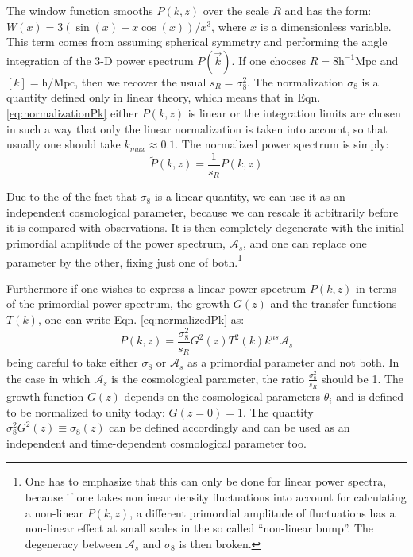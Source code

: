 The window function smooths $P(k,z)$ over the scale $R$ and has
the form: $W(x)=3(\sin(x)-x\cos(x))/x^{3}$, where $x$ is a dimensionless
variable. This term comes from assuming spherical symmetry and performing
the angle integration of the 3-D power spectrum $P(\vec{k})$. If
one chooses $R=8\mbox{h}^{-1}\mbox{Mpc}$ and $[k]=\mbox{h}/\mbox{Mpc}$,
then we recover the usual $s_{R}=\sigma_{8}^{2}$. The normalization
$\sigma_{8}$ is a quantity defined only in linear theory, which means
that in Eqn. \ref{eq:normalizationPk} either $P(k,z)$ is linear
or the integration limits are chosen in such a way that only the linear
normalization is taken into account, so that usually one should take
$k_{max}\approx0.1$. The normalized power spectrum is simply: 
\begin{equation}
\tilde{P}(k,z)=\frac{1}{s_{R}}P(k,z)
\end{equation}


Due to the of the fact that $\sigma_{8}$ is a linear quantity, we
can use it as an independent cosmological parameter, because we can
rescale it arbitrarily before it is compared with observations. It
is then completely degenerate with the initial primordial amplitude
of the power spectrum, $\mathcal{A}_{s}$, and one can replace one
parameter by the other, fixing just one of both.\footnote{One has to emphasize that this can only be done for linear power spectra,
	because if one takes nonlinear density fluctuations into account for
	calculating a non-linear $P(k,z)$, a different primordial amplitude
	of fluctuations has a non-linear effect at small scales in the so
	called ``non-linear bump''. The degeneracy between $\mathcal{A}_{s}$
	and $\sigma_{8}$ is then broken.}

Furthermore if one wishes to express a linear power spectrum $P(k,z)$
in terms of the primordial power spectrum, the growth $G(z)$ and
the transfer functions $T(k)$, one can write Eqn. \ref{eq:normalizedPk}
as: 
\begin{equation}
P(k,z)=\frac{\sigma_{8}^{2}}{s_{R}}G^{2}(z)T^{2}(k)k^{ns}\mathcal{A}_{s}
\end{equation}
being careful to take either $\sigma_{8}$ or $\mathcal{A}_{s}$ as
a primordial parameter and not both. In the case in which $\mathcal{A}_{s}$
is the cosmological parameter, the ratio $\frac{\sigma_{8}^{2}}{s_{R}}$
should be 1. The growth function $G(z)$ depends on the cosmological
parameters $\theta_{i}$ and is defined to be normalized to unity
today: $G(z=0)=1$. The quantity $\sigma_{8}^{2}G^{2}(z)\equiv\sigma_{8}(z)$
can be defined accordingly and can be used as an independent and time-dependent
cosmological parameter too. 

